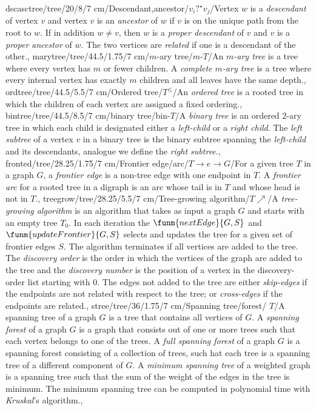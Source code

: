 dscasctree/tree/20/8/7 cm/{Descendant,ancestor}/{$v_i ?^{\star} v_j$}/{Vertex $w$ is a \emph{descendant} of vertex $v$ and vertex $v$ is an \emph{ancestor} of $w$ if $v$ is on the unique path from the root to $w$. If in addition $w\neq v$, then $w$ is a \emph{proper descendant} of $v$ and $v$ is a \emph{proper ancestor} of $w$. The two vertices are \emph{related} if one is a descendant of the other.},%
marytree/tree/44.5/1.75/7 cm/{$m$-ary tree}/{$m$-$T$}/{An \emph{$m$-ary tree} is a tree where every vertex has $m$ or fewer children. A \emph{complete $m$-ary tree} is a tree where every internal vertex has exactly $m$ children and all leaves have the same depth.},%
ordtree/tree/44.5/5.5/7 cm/{Ordered tree}/{$T^{\leq}$}/{An \emph{ordered tree} is a rooted tree in which the children of each vertex are assigned a fixed ordering.},%
bintree/tree/44.5/8.5/7 cm/{binary tree}/{bin-$T$}/{A \emph{binary tree} is an ordered $2$-ary tree in which each child is designated either a \emph{left-child} or a \emph{right child}. The \emph{left subtree} of a vertex $v$ in a binary tree is the binary
 subtree spanning the \emph{left-child} and its descendants, analogue we define the \emph{right subtree}.},%
fronted/tree/28.25/1.75/7 cm/{Frontier edge/arc}/{$T\rightarrow e\rightarrow G$}/{For a given tree $T$ in a graph $G$, a \emph{frontier edge} is a non-tree edge with one endpoint in $T$. A \emph{frontier arc} for a rooted tree in a digraph is an arc whose tail is in $T$ and whose head is not in $T$.},
treegrow/tree/28.25/5.5/7 cm/{Tree-growing algorithm}/{$T\nearrow$}/{A \emph{tree-growing algorithm} is an algorithm that takes as input a graph $G$ and starts with an empty tree $T_0$. In each iteration the $\funm{nextEdge}{G,S}$ and $\funm{updateFrontier}{G,S}$ selects and updates the tree for a given set of frontier edges $S$. The algorithm terminates if all vertices are added to the tree. The \emph{discovery order} is the order in which the vertices of the graph are added to the tree and the \emph{discovery number} is the position of a vertex in the discovery-order list starting with $0$. The edges not added to the tree are either \emph{skip-edges} if the endpoints are not related with respect to the tree; or \emph{cross-edges} if the endpoints are related.},
stree/tree/36/1.75/7 cm/{Spanning tree/forest}/{\spanning{} $T$}/{A spanning tree of a graph $G$ is a tree that contains all vertices of $G$. A \emph{spanning forest} of a graph $G$ is a graph that consists out of one or more trees such that each vertex belongs to one of the trees. A \emph{full spanning forest} of a graph $G$ is a spanning forest consisting of a collection of trees, such hat each tree is a spanning tree of a different component of $G$. A \emph{minimum spanning tree} of a weighted graph is a spanning tree such that the sum of the weight of the edges in the tree is minimum. The minimum spanning tree can be computed in polynomial time with \emph{Kruskal}'s algorithm.},%
